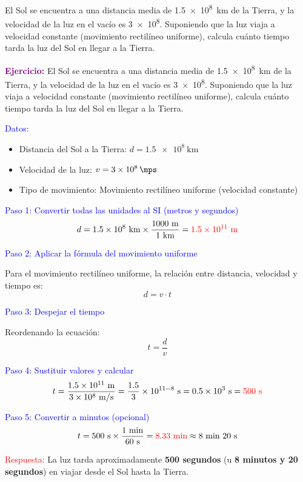 \begin{exercise}
    El Sol se encuentra a una distancia media de \qty{1.5e8}{\kilo\m} de la Tierra, y la velocidad de la luz en el vacío es \qty{3e8}{\mps}. Suponiendo que la luz viaja a velocidad constante (movimiento rectilíneo uniforme), calcula cuánto tiempo tarda la luz del Sol en llegar a la Tierra.

    \begin{solu}
        \textbf{\textcolor{purple}{Ejercicio:}} El Sol se encuentra a una distancia media de \qty{1.5e8}{\kilo\m} de la Tierra, y la velocidad de la luz en el vacío es \qty{3e8}{\mps}. Suponiendo que la luz viaja a velocidad constante (movimiento rectilíneo uniforme), calcula cuánto tiempo tarda la luz del Sol en llegar a la Tierra.

        \vspace{0.3cm}

        \textcolor{blue}{Datos:}
        \begin{itemize}
            \item Distancia del Sol a la Tierra: $d = \qty{1.5e8}{\kilo\m}$
            \item Velocidad de la luz: $v = \qty{3e8}{\mps}$
            \item Tipo de movimiento: Movimiento rectilíneo uniforme (velocidad constante)
        \end{itemize}

        \textcolor{blue}{Paso 1: Convertir todas las unidades al SI (metros y segundos)}
        \[
            d = 1.5 \times 10^8 \text{ km} \times \frac{1000 \text{ m}}{1 \text{ km}} = \textcolor{red}{1.5 \times 10^{11} \text{ m}}
        \]

        \textcolor{blue}{Paso 2: Aplicar la fórmula del movimiento uniforme}

        Para el movimiento rectilíneo uniforme, la relación entre distancia, velocidad y tiempo es:
        \[
            \boxed{d = v \cdot t}
        \]

        \textcolor{blue}{Paso 3: Despejar el tiempo}

        Reordenando la ecuación:
        \[
            t = \frac{d}{v}
        \]

        \textcolor{blue}{Paso 4: Sustituir valores y calcular}
        \[
            t = \frac{1.5 \times 10^{11} \text{ m}}{3 \times 10^8 \text{ m/s}} = \frac{1.5}{3} \times 10^{11-8} \text{ s} = 0.5 \times 10^3 \text{ s} = \textcolor{red}{500 \text{ s}}
        \]

        \textcolor{blue}{Paso 5: Convertir a minutos (opcional)}
        \[
            t = 500 \text{ s} \times \frac{1 \text{ min}}{60 \text{ s}} = \textcolor{red}{8.33 \text{ min}} \approx 8 \text{ min } 20 \text{ s}
        \]

        \textcolor{red}{Respuesta:} La luz tarda aproximadamente \textbf{500 segundos} (u \textbf{8 minutos y 20 segundos}) en viajar desde el Sol hasta la Tierra.
    \end{solu}
\end{exercise}


